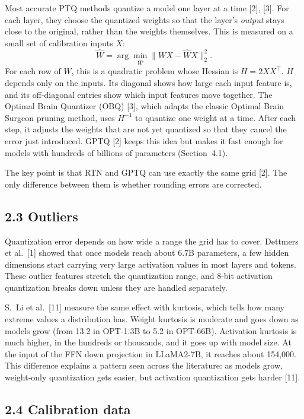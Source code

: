 \documentclass[10pt,twocolumn]{article}
\begin{document}
Most accurate PTQ methods quantize a model one layer at a time [2], [3].
For each layer, they choose the quantized weights so that the layer's
\emph{output} stays close to the original, rather than the weights
themselves. This is measured on a small set of calibration inputs $X$:
\[
\hat{W} = \arg\min_{\hat{W}} \lVert WX - \hat{W}X \rVert_2^2 .
\]
For each row of $W$, this is a quadratic problem whose Hessian is
$H = 2XX^{\top}$. $H$ depends only on the inputs. Its diagonal shows how
large each input feature is, and its off-diagonal entries show which
input features move together. The Optimal Brain Quantizer (OBQ) [3],
which adapts the classic Optimal Brain Surgeon pruning method, uses
$H^{-1}$ to quantize one weight at a time. After each step, it adjusts
the weights that are not yet quantized so that they cancel the error
just introduced. GPTQ [2] keeps this idea but makes it fast enough for
models with hundreds of billions of parameters (Section~4.1).

The key point is that RTN and GPTQ can use exactly the same grid [2].
The only difference between them is whether rounding errors are
corrected.

\subsection{2.3 Outliers}

Quantization error depends on how wide a range the grid has to cover.
Dettmers et al.~[1] showed that once models reach about 6.7B parameters,
a few hidden dimensions start carrying very large activation values in
most layers and tokens. These outlier features stretch the quantization
range, and 8-bit activation quantization breaks down unless they are
handled separately.

S.~Li et al.~[11] measure the same effect with kurtosis, which tells how
many extreme values a distribution has. Weight kurtosis is moderate and
goes down as models grow (from 13.2 in OPT-1.3B to 5.2 in OPT-66B).
Activation kurtosis is much higher, in the hundreds or thousands, and it
goes up with model size. At the input of the FFN down projection in
LLaMA2-7B, it reaches about 154,000. This difference explains a pattern
seen across the literature: as models grow, weight-only quantization
gets easier, but activation quantization gets harder [11].

\subsection{2.4 Calibration data}
\end{document}

